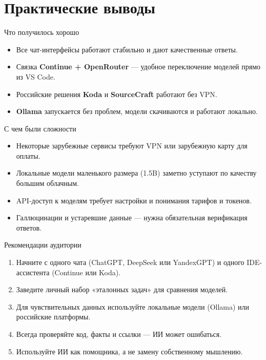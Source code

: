 \documentclass[aspectratio=169,10pt,russian]{beamer}
\begin{document}
\section{Практические выводы}

\begin{frame}{Что получилось хорошо}
  \begin{itemize}
    \item Все чат-интерфейсы работают стабильно и дают качественные ответы.
    \item Связка \textbf{Continue + OpenRouter} — удобное переключение моделей прямо из VS Code.
    \item Российские решения \textbf{Koda} и \textbf{SourceCraft} работают без VPN.
    \item \textbf{Ollama} запускается без проблем, модели скачиваются и работают локально.
  \end{itemize}
\end{frame}

\begin{frame}{С чем были сложности}
  \begin{itemize}
    \item Некоторые зарубежные сервисы требуют VPN или зарубежную карту для оплаты.
    \item Локальные модели маленького размера (1.5B) заметно уступают по качеству большим облачным.
    \item API-доступ к моделям требует настройки и понимания тарифов и токенов.
    \item Галлюцинации и устаревшие данные — нужна обязательная верификация ответов.
  \end{itemize}
\end{frame}

\begin{frame}{Рекомендации аудитории}
  \begin{enumerate}
    \item Начните с одного чата (ChatGPT, DeepSeek или YandexGPT) и одного IDE-ассистента (Continue или Koda).
    \item Заведите личный набор «эталонных задач» для сравнения моделей.
    \item Для чувствительных данных используйте локальные модели (Ollama) или российские платформы.
    \item Всегда проверяйте код, факты и ссылки — ИИ может ошибаться.
    \item Используйте ИИ как помощника, а не замену собственному мышлению.
  \end{enumerate}
\end{frame}
\end{document}
